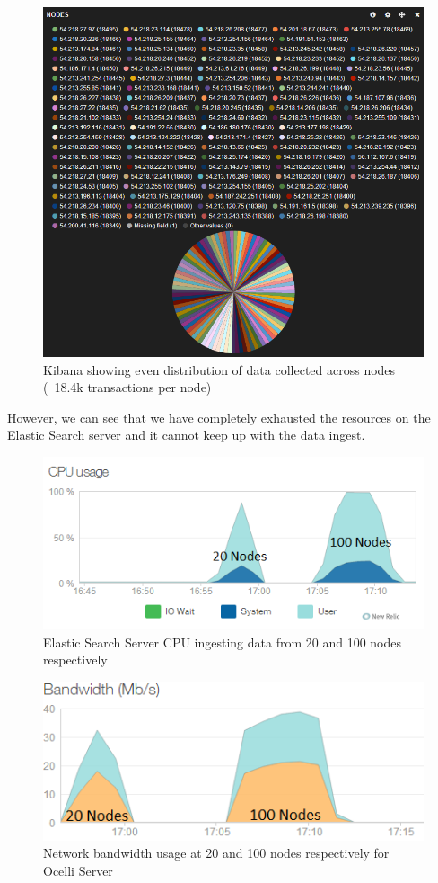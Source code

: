 \documentclass{llncs}
\begin{document}
\begin{figure}[h]
    \centering
    \includegraphics[scale=0.7]{app9}
    \caption{Kibana showing even distribution of data collected across nodes (~18.4k transactions per node)}
    \label{fig:ocelli_dm}
\end{figure}

However, we can see that we have completely exhausted the resources on the Elastic Search server and it cannot keep up with the data ingest.

\begin{figure}[h]
    \centering
    \includegraphics[scale=0.7]{app10}
    \caption{Elastic Search Server CPU ingesting data from 20 and 100 nodes respectively}
    \label{fig:ocelli_dm}
\end{figure}

\begin{figure}[h]
    \centering
    \includegraphics[scale=0.7]{app11}
    \caption{Network bandwidth usage at 20 and 100 nodes respectively for Ocelli Server}
    \label{fig:ocelli_dm}
\end{figure}
\end{document}
